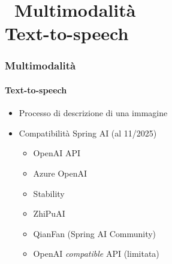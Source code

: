 \section{\faWrench\ Multimodalità\\\small{Text-to-speech}} %
\label{sec:spring-tts}
%
\begin{frame}[t,fragile] \frametitle{Multimodalità}
    \framesubtitle{Text-to-speech}
    {\footnotesize
    \begin{itemize}[leftmargin=10pt,align=right]
        \item[\alert{\faArrowCircleRight}] Processo di descrizione di una immagine
        \item[\alert{\faArrowCircleRight}] Compatibilità Spring AI (al 11/2025)
        \begin{itemize}[leftmargin=10pt,align=right]
            \item[\alert{\faArrowCircleRight}] OpenAI API
            \item[\alert{\faArrowCircleRight}] Azure OpenAI
            \item[\alert{\faArrowCircleRight}] Stability
            \item[\alert{\faArrowCircleRight}] ZhiPuAI
            \item[\alert{\faArrowCircleRight}] QianFan (Spring AI Community)
            \item[\alert{\faArrowCircleRight}] OpenAI \textit{compatible} API (limitata)
        \end{itemize}
    \end{itemize}
    }
\end{frame} 
%
